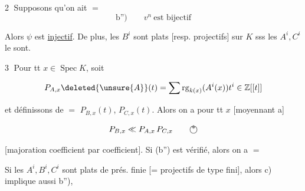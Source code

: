 \textcircled{2} Supposons qu'on ait $=$
\[
\text{b'')}\qquad v^n\ \text{est bijectif}
\]

Alors $\psi$ est \uline{injectif}.  De plus, les $B^i$ sont plats [resp.  projectifs] sur $K$ sss les $A^i,C^i$ le sont.


\textcircled{3}  Pour tt $x\in\operatorname{Spec} K$, soit

\[
 P_{A,x}\deleted{\unsure{A}}(t)=\sum\operatorname{rg}_{k(x)}(A^i(x))t^i\in\mathbb Z[[t]]
\]

et définissons de $=$ $P_{B,x}(t)$, $P_{C,x}(t)$. Alors on a  pour tt $x$ [moyennant a]

\[
P_{B,x}\ll P_{A,x}\,P_{C,x}\tag*{\textcircled{*}}
\]

[majoration coefficient par coefficient]. Si (b'') est vérifié, alors on a $=$


Si les $A^i,B^i,C^i$ sont plats de prés. finie [= projectifs de type fini], alors c) implique aussi b''), 

